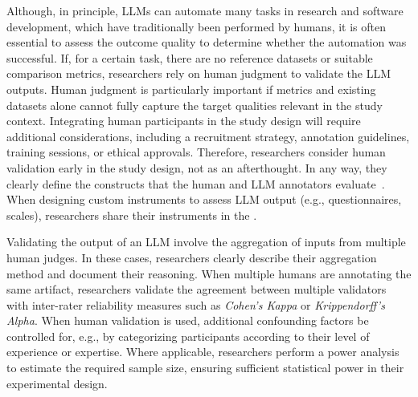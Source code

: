 
Although, in principle, LLMs can automate many tasks in research and software development, which have traditionally been performed by humans, it is often essential to assess the outcome quality to determine whether the automation was successful.
If, for a certain task, there are no reference datasets or suitable comparison metrics, researchers \should rely on human judgment to validate the LLM outputs.
Human judgment is particularly important if metrics and existing datasets alone cannot fully capture the target qualities relevant in the study context.
Integrating human participants in the study design will require additional considerations, including a recruitment strategy, annotation guidelines, training sessions, or ethical approvals.
Therefore, researchers \should consider human validation early in the study design, not as an afterthought.
In any way, they \must clearly define the constructs that the human and LLM annotators evaluate~\cite{DBLP:conf/ease/RalphT18}.
When designing custom instruments to assess LLM output (e.g., questionnaires, scales), researchers \should share their instruments in the \supplementarymaterial.

Validating the output of an LLM \may involve the aggregation of inputs from multiple human judges.
In these cases, researchers \should clearly describe their aggregation method and document their reasoning.
When multiple humans are annotating the same artifact, researchers \should validate the agreement between multiple validators with inter-rater reliability measures such as \emph{Cohen's Kappa} or \emph{Krippendorff's Alpha}.
When human validation is used, additional confounding factors \should be controlled for, e.g., by categorizing participants according to their level of experience or expertise.
Where applicable, researchers \should perform a power analysis to estimate the required sample size, ensuring sufficient statistical power in their experimental design.

